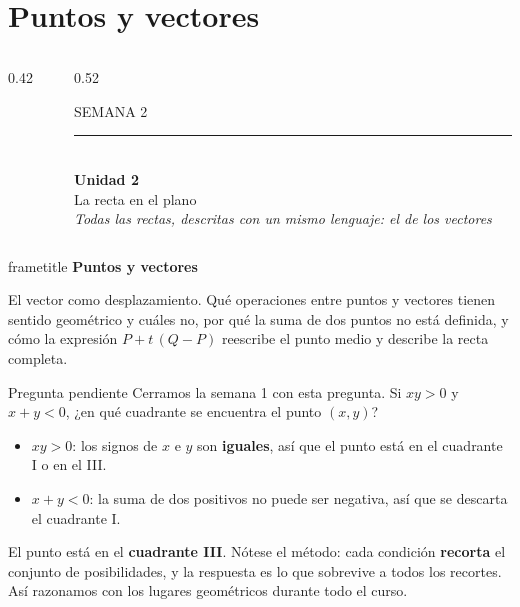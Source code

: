 \documentclass[aspectratio=169,10pt]{beamer}
\newcommand{\destaca}[1]{%
  \par\vspace{3pt}\noindent
  \colorbox{turquesaClaro}{%
    \parbox{\dimexpr\linewidth-2\fboxsep\relax}{\vspace{3pt}#1\vspace{3pt}}}%
  \par\vspace{3pt}}
\newcommand{\hojaSesion}[2]{%
  \vfill
  \begin{beamercolorbox}[wd=\textwidth,sep=16pt,center]{frametitle}
    {\Large\bfseries #1}\\[11pt]
    \begin{minipage}{0.82\textwidth}\centering\small #2\end{minipage}
  \end{beamercolorbox}
  \vfill}
\begin{document}
\section{Puntos y vectores}
\begin{frame}[plain]
  \begin{columns}[c]
    \begin{column}{0.42\textwidth}
      \centering
    \end{column}
    \begin{column}{0.52\textwidth}
      \raggedright
      {\small\color{grisT} SEMANA 2}\\[8pt]
      {\color{dorado}\rule{0.55\linewidth}{1.6pt}}\\[12pt]
      {\LARGE\bfseries\color{turquesaGA} Unidad 2}\\[8pt]
      {\large La recta en el plano}\\[14pt]
      {\small\color{grisT}\itshape Todas las rectas, descritas con un
      mismo lenguaje: el de los vectores}
    \end{column}
  \end{columns}
\end{frame}
\begin{frame}[plain]
  \hojaSesion{Puntos y vectores}{%
  El vector como desplazamiento. Qué operaciones entre puntos y
  vectores tienen sentido geométrico y cuáles no, por qué la suma de
  dos puntos no está definida, y cómo la expresión $P+t\,(Q-P)$
  reescribe el punto medio y describe la recta completa.}
\end{frame}
\begin{frame}{Pregunta pendiente}
  Cerramos la semana 1 con esta pregunta. Si $xy>0$ y $x+y<0$,
  ¿en qué cuadrante se encuentra el punto $(x,y)$?

  \vspace{0.3cm}
  \begin{itemize}
    \item $xy>0$: los signos de $x$ e $y$ son \textbf{iguales},
      así que el punto está en el cuadrante I o en el III.
    \item $x+y<0$: la suma de dos positivos no puede ser negativa,
      así que se descarta el cuadrante I.
  \end{itemize}

  \vspace{0.3cm}
  \destaca{El punto está en el \textbf{cuadrante III}. Nótese el método:
  cada condición \textbf{recorta} el conjunto de posibilidades, y la
  respuesta es lo que sobrevive a todos los recortes. Así razonamos con
  los lugares geométricos durante todo el curso.}
\end{frame}
\end{document}
